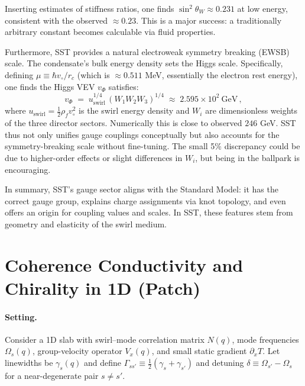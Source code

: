\documentclass[reprint,aps,onecolumn,nofootinbib]{revtex4-2}
\begin{document}
	\noindent Inserting estimates of stiffness ratios, one finds $\sin^2\theta_W \approx 0.231$ at low energy, consistent with the observed $\approx0.23$. This is a major success: a traditionally arbitrary constant becomes calculable via fluid properties.

	Furthermore, SST provides a natural electroweak symmetry breaking (EWSB) scale. The condensate’s bulk energy density sets the Higgs scale. Specifically, defining $\mu \equiv \hbar v_{\circ}/r_c$ (which is $\approx0.511$ MeV, essentially the electron rest energy), one finds the Higgs VEV $v_{\Phi}$ satisfies:
	\[
		v_{\Phi} \;=\; u_{\text{swirl}}^{1/4}\,(W_1 W_2 W_3)^{1/4} \;\approx\; 2.595\times 10^2~\text{GeV}\,,
	\]
	where $u_{\text{swirl}} = \frac{1}{2}\rho_f v_{\circ}^2$ is the swirl energy density and $W_i$ are dimensionless weights of the three director sectors. Numerically this is close to observed $246$ GeV. SST thus not only unifies gauge couplings conceptually but also accounts for the symmetry-breaking scale without fine-tuning. The small 5\% discrepancy could be due to higher-order effects or slight differences in $W_i$, but being in the ballpark is encouraging.

	In summary, SST’s gauge sector aligns with the Standard Model: it has the correct gauge group, explains charge assignments via knot topology, and even offers an origin for coupling values and scales. In SST, these features stem from geometry and elasticity of the swirl medium.


\section{Coherence Conductivity and Chirality in 1D (Patch)}


    \paragraph{Setting.} Consider a 1D slab with swirl–mode correlation matrix $N(q)$, mode frequencies $\Omega_s(q)$, group-velocity operator $V_x(q)$, and small static gradient $\partial_x T$. Let linewidths be $\gamma_s(q)$ and define $\Gamma_{ss'}\equiv\tfrac12(\gamma_s+\gamma_{s'})$ and detuning $\delta\equiv\Omega_{s'}-\Omega_s$ for a near-degenerate pair $s\neq s'$.
\end{document}
